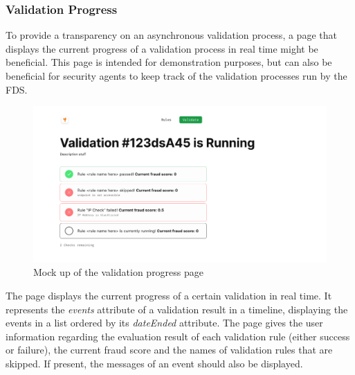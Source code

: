 \newpage
\subsubsection{Validation Progress}

To provide a transparency on an asynchronous validation process, a page that displays the current progress of a validation process in real time might be beneficial. This page is intended for demonstration purposes, but can also be beneficial for security agents to keep track of the validation processes run by the FDS.

\begin{figure}[!h]
 \includegraphics[width=\textwidth]{diagrams/mockup_validation_progress.png}
 \caption{Mock up of the validation progress page}
\end{figure}

The page displays the current progress of a certain validation in real time. It represents the \emph{events} attribute of a validation result in a timeline, displaying the events in a list ordered by its \emph{dateEnded} attribute. The page gives the user information regarding the evaluation result of each validation rule (either success or failure), the current fraud score and the names of validation rules that are skipped. If present, the messages of an event should also be displayed. 